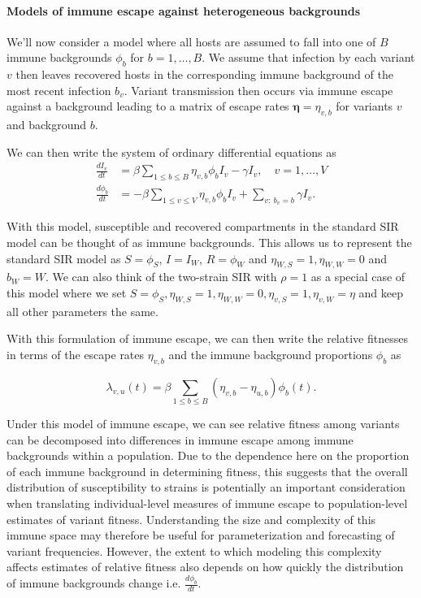 \documentclass[11pt,oneside,letterpaper]{article}
\renewcommand{\vec}[1]{\boldsymbol{#1}}
\newcommand{\wt}{W}
\newcommand{\varEscape}{\eta}
\newcommand{\varTransmission}{\rho}
\begin{document}
\paragraph{Models of immune escape against heterogeneous backgrounds}%

We'll now consider a model where all hosts are assumed to fall into one of $B$ immune backgrounds $\phi_{b}$ for $b =1, \ldots, B$.
We assume that infection by each variant $v$ then leaves recovered hosts in the corresponding immune background of the most recent infection $b_{v}$.
Variant transmission then occurs via immune escape against a background leading to a matrix of escape rates $\vec{\varEscape} = \varEscape_{v,b}$ for variants $v$ and background $b$.

We can then write the system of ordinary differential equations as
\begin{align*}
    \frac{d I_{v}}{dt} &= \beta \sum_{1\leq b \leq B} \varEscape_{v, b} \phi_{b} I_{v} - \gamma I_{v}, \quad v = 1, \ldots, V\\
    \frac{d \phi_{b}}{dt} &= - \beta \sum_{1\leq v \leq V} \varEscape_{v,b}\phi_{b} I_{v} +  \sum_{v:\ b_{v} = b} \gamma I_{v}.
\end{align*}

With this model, susceptible and recovered compartments in the standard SIR model can be thought of as immune backgrounds.
This allows us to represent the standard SIR model as $S = \phi_{S}$, $I = I_{\wt}$, $R = \phi_{\wt}$ and $\varEscape_{\wt, S} = 1, \varEscape_{\wt, \wt} = 0$ and $b_{\wt} = \wt$.
We can also think of the two-strain SIR with $\varTransmission = 1$ as a special case of this model where we set $S = \phi_{S}, \varEscape_{\wt, S} = 1, \varEscape_{\wt, \wt} = 0, \varEscape_{v, S} = 1, \varEscape_{v, \wt} = \varEscape$ and keep all other parameters the same.

With this formulation of immune escape, we can then write the relative fitnesses in terms of the escape rates $\varEscape_{v,b}$ and the immune background proportions $\phi_{b}$ as

\begin{equation} \label{eq:escape_relative_fitness}
    \lambda_{v, u}(t) = \beta \sum_{1\leq b \leq B}(\varEscape_{v,b} - \varEscape_{u,b}) \phi_{b}(t).
\end{equation}

Under this model of immune escape, we can see relative fitness among variants can be decomposed into differences in immune escape among immune backgrounds within a population.
Due to the dependence here on the proportion of each immune background in determining fitness, this suggests that the overall distribution of susceptibility to strains is potentially an important consideration when translating individual-level measures of immune escape to population-level estimates of variant fitness.
Understanding the size and complexity of this immune space may therefore be useful for parameterization and forecasting of variant frequencies.
However, the extent to which modeling this complexity affects estimates of relative fitness also depends on how quickly the distribution of immune backgrounds change i.e. $\frac{d\phi_{b}}{dt}$.
\end{document}
